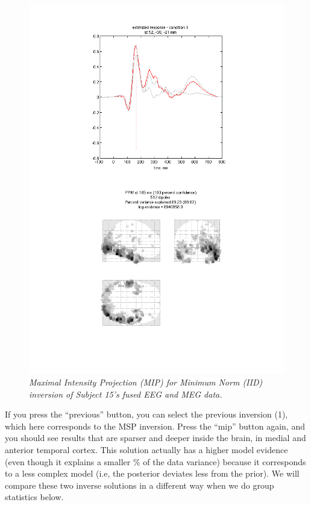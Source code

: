 \begin{figure}
\begin{center}
\includegraphics[width=150mm]{multi/figures/figure13}
\caption{\em Maximal Intensity Projection (MIP) for Minimum Norm (IID) inversion of Subject 15’s fused EEG and MEG data. \label{multi:fig:13}}
\end{center}
\end{figure}

If you press the ``previous'' button, you can select the previous inversion (1), which here corresponds to the MSP inversion. Press the ``mip'' button again, and you should see results that are sparser and deeper inside the brain, in medial and anterior temporal cortex. This solution actually has a higher model evidence (even though it explains a smaller \% of the data variance) because it corresponds to a less complex model (i.e, the posterior deviates less from the prior). We will compare these two inverse solutions in a different way when we do group statistics below.

